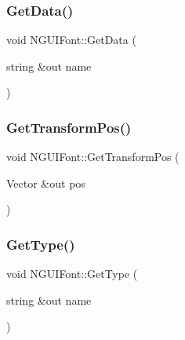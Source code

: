 \hypertarget{class_n_g_u_i_font_ae46b8eda099c445eabd4c66b56dae0f0}{}\label{class_n_g_u_i_font_ae46b8eda099c445eabd4c66b56dae0f0} 
\subsubsection{\texorpdfstring{Get\+Data()}{GetData()}}
{\footnotesize\ttfamily void N\+G\+U\+I\+Font\+::\+Get\+Data (\begin{DoxyParamCaption}\item[{string \&out}]{name }\end{DoxyParamCaption})}

\hypertarget{class_n_g_u_i_font_a2b924c660a4d96672f7b8a39645dffa8}{}\label{class_n_g_u_i_font_a2b924c660a4d96672f7b8a39645dffa8} 
\subsubsection{\texorpdfstring{Get\+Transform\+Pos()}{GetTransformPos()}}
{\footnotesize\ttfamily void N\+G\+U\+I\+Font\+::\+Get\+Transform\+Pos (\begin{DoxyParamCaption}\item[{Vector \&out}]{pos }\end{DoxyParamCaption})}

\hypertarget{class_n_g_u_i_font_a5abe2f02d48be4985cf4f265d0c08ca1}{}\label{class_n_g_u_i_font_a5abe2f02d48be4985cf4f265d0c08ca1} 
\subsubsection{\texorpdfstring{Get\+Type()}{GetType()}}
{\footnotesize\ttfamily void N\+G\+U\+I\+Font\+::\+Get\+Type (\begin{DoxyParamCaption}\item[{string \&out}]{name }\end{DoxyParamCaption})}

\hypertarget{class_n_g_u_i_font_a467d7cbcc66f7c24de960a1f34bf844b}{}\label{class_n_g_u_i_font_a467d7cbcc66f7c24de960a1f34bf844b} 
